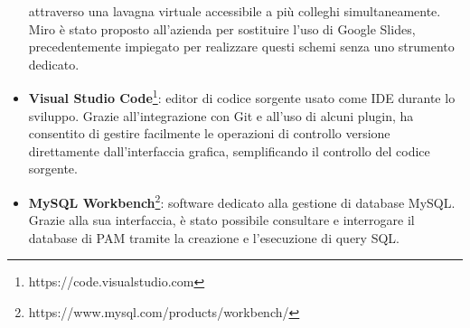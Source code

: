 \begin{itemize}
    attraverso una lavagna virtuale accessibile a più colleghi simultaneamente. Miro è stato proposto all'azienda per sostituire l’uso di Google Slides, precedentemente impiegato
    per realizzare questi schemi senza uno strumento dedicato.
    \item \textbf{Visual Studio Code}\footnote{https://code.visualstudio.com}: editor di codice sorgente usato come IDE durante lo sviluppo. Grazie all'integrazione con Git e all'uso di alcuni plugin, ha consentito
    di gestire facilmente le operazioni di controllo versione direttamente dall’interfaccia grafica, semplificando il controllo del codice sorgente.
    \item \textbf{MySQL Workbench}\footnote{https://www.mysql.com/products/workbench/}: software dedicato alla gestione di database MySQL. Grazie alla sua interfaccia, è stato possibile consultare e interrogare il database di \ac{PAM}
    tramite la creazione e l’esecuzione di query SQL.
\end{itemize}

